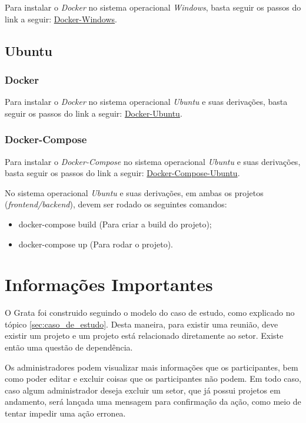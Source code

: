 Para instalar o \textit{Docker} no sistema operacional \textit{Windows}, basta seguir os passos do link a seguir: \href{https://docs.docker.com/docker-for-windows/install/}{Docker-Windows}.

\subsection{Ubuntu}

\subsubsection{Docker}

Para instalar o \textit{Docker} no sistema operacional \textit{Ubuntu} e suas derivações, basta seguir os passos do link a seguir: \href{https://www.digitalocean.com/community/tutorials/how-to-install-and-use-docker-on-ubuntu-20-04}{Docker-Ubuntu}.

\subsubsection{Docker-Compose}

Para instalar o \textit{Docker-Compose} no sistema operacional \textit{Ubuntu} e suas derivações, basta seguir os passos do link a seguir: \href{https://www.digitalocean.com/community/tutorials/how-to-install-and-use-docker-compose-on-ubuntu-20-04-pt}{Docker-Compose-Ubuntu}.

No sistema operacional \textit{Ubuntu} e suas derivações, em ambas os projetos (\textit{frontend/backend}), devem ser rodado os seguintes comandos: 
\begin{itemize}
    \item docker-compose build (Para criar a build do projeto);
    \item docker-compose up (Para rodar o projeto).
\end{itemize}

\section{Informações Importantes}

O Grata foi construido seguindo o modelo do caso de estudo, como explicado no tópico \ref{sec:caso_de_estudo}. Desta maneira, para existir uma reunião, deve existir um projeto e um projeto está relacionado diretamente ao setor. Existe então uma questão de dependência.

Os administradores podem visualizar mais informações que os participantes, bem como poder editar e excluir coisas que os participantes não podem. Em todo caso, caso algum administrador deseja excluir um setor, que já possui projetos em andamento, será lançada uma mensagem para confirmação da ação, como meio de tentar impedir uma ação erronea.

